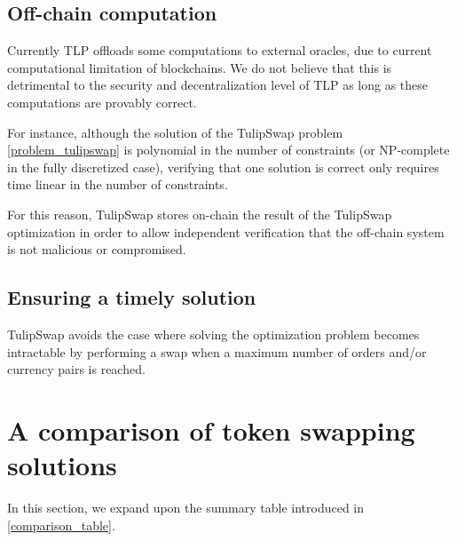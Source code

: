 \documentclass[11pt, reqno]{amsart}
\theoremstyle{definition}
\theoremstyle{remark}
\begin{document}
\subsection{Off-chain computation}
Currently TLP offloads some computations to external oracles, due to current
computational limitation of blockchains. We do not believe that this is detrimental
to the security and decentralization level of TLP as long as these computations
are provably correct.

For instance, although the solution of the TulipSwap problem \ref{problem_tulipswap}
is polynomial in the number of constraints (or NP-complete in the fully discretized case),
verifying that one solution is correct only requires time linear in the number of
constraints.

For this reason, TulipSwap stores on-chain the result of the TulipSwap optimization
in order to allow independent verification that the off-chain system is not
malicious or compromised.

\subsection{Ensuring a timely solution}
TulipSwap avoids the case where solving the optimization problem becomes
intractable by performing a swap when a maximum number of orders and/or
currency pairs is reached.


\section{A comparison of token swapping solutions}
\label{comparison_section}

In this section, we expand upon the summary table introduced in \ref{comparison_table}.


\end{document}
